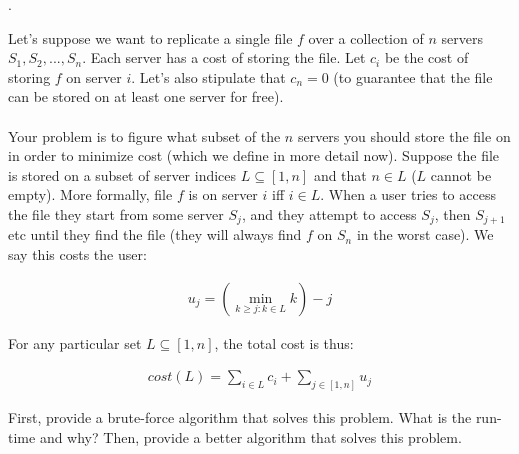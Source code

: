 \documentclass[12pt]{article}
\newcounter{quesnum}
\newcommand{\question}[2][??]{
\begin{list}{\labelitemi}{\leftmargin=2em}
\item [\arabic{quesnum}.] {} {#2}
\end{list}
\addtocounter{quesnum}{1}
}
\newcommand{\answer}[2][??]{
\ifthenelse{\boolean{solution}}{
\color{red} #2 \color{black}}
{\vspace*{#1}}
}
\begin{document}
\question[3]{
Let's suppose we want to replicate a single file $f$ over a collection of $n$ servers $S_1,S_2,...,S_n$. Each server has a cost of storing the file. Let $c_i$ be the cost of storing $f$ on server $i$. Let's also stipulate that $c_n=0$ (to guarantee that the file can be stored on at least one server for free).\\
\\
Your problem is to figure what subset of the $n$ servers you should store the file on in order to minimize cost (which we define in more detail now). Suppose the file is stored on a subset of server indices $L \subseteq [1,n]$ and that $n \in L$ ($L$ cannot be empty). More formally, file $f$ is on server $i$ iff $i \in L$. When a user tries to access the file they start from some server $S_j$, and they attempt to access $S_j$, then $S_{j+1}$ etc until they find the file (they will always find $f$ on $S_n$ in the worst case). We say this costs the user:

\begin{align*}
u_j = \left( \min\limits_{k \geq j : k \in L} k \right) - j
\end{align*}

For any particular set $L \subseteq [1,n]$, the total cost is thus:

\begin{align*}
cost(L) = \sum\limits_{i \in L} c_i + \sum\limits_{j \in [1,n]} u_j
\end{align*}

First, provide a brute-force algorithm that solves this problem. What is the run-time and why? Then, provide a better algorithm that solves this problem.
}

\answer[0.25 in]{
...
}

\end{document}
